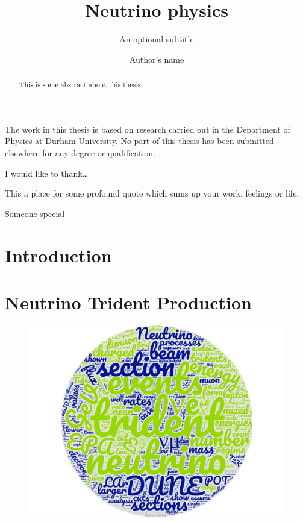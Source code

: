 \documentclass[twoside,openright,frontopenright]{ip3thesis}
\begin{document}
\title{Neutrino physics }
\subtitle{An optional subtitle}
\author{Author's name}
\maketitlepage*

\begin{abstract}
%
	This is some abstract about this thesis.
%
\end{abstract}

\disableprotrusion
\tableofcontents*
\listoffigures
\listoftables
\enableprotrusion

\begin{declaration*}
%
	The work in this thesis is based on research carried out in the Department of
	Physics at Durham University. No part of this thesis has been
	submitted elsewhere for any degree or qualification.
%
\end{declaration*}

\begin{acknowledgements*}
%
	I would like to thank\ldots
%
\end{acknowledgements*}

\begin{epigraph*}
%
	This a place for some profound quote which sums up your work, feelings or
	life.
%
\end{epigraph*}

\begin{dedication*}
%
	Someone special
%
\end{dedication*}

\cleardoublepage

\chapter{Introduction}


\chapter{Neutrino Trident Production}
\begin{figure}[th]
\centering
\includegraphics[width=\textwidth]{img/trident_wordcloud.png}
\end{figure}

\end{document}
